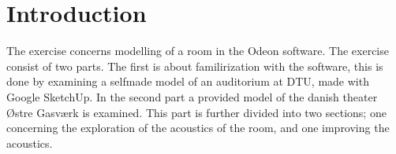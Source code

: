 \section{Introduction} %
\label{sec:introduction}
The exercise concerns modelling of a room in the Odeon software. The exercise consist of two parts. The first is about familirization with the software, this is done by examining a selfmade model of an auditorium at DTU, made with Google SketchUp.
In the second part a provided model of the danish theater \O stre Gasv\ae rk is examined. This part is further divided into two sections; one concerning the exploration of the acoustics of the room, and one improving the acoustics.

